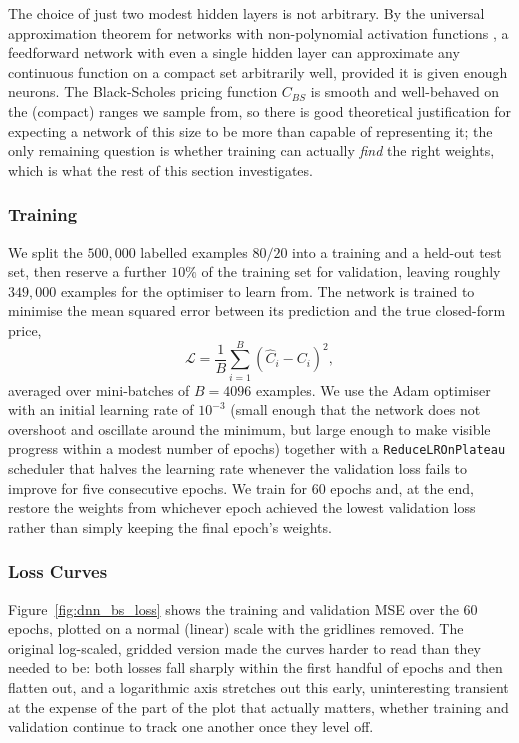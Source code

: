 \documentclass[a4paper,11pt, titlepage]{article}
\theoremstyle{definition}
\theoremstyle{plain}
\theoremstyle{remark}
\begin{document}
The choice of just two modest hidden layers is not arbitrary. By the universal approximation theorem for networks with non-polynomial activation functions \cite{leshno1993}, a feedforward network with even a single hidden layer can approximate any continuous function on a compact set arbitrarily well, provided it is given enough neurons. The Black-Scholes pricing function $C_{BS}$ is smooth and well-behaved on the (compact) ranges we sample from, so there is good theoretical justification for expecting a network of this size to be more than capable of representing it; the only remaining question is whether training can actually \emph{find} the right weights, which is what the rest of this section investigates.

\subsubsection{Training}

We split the $500{,}000$ labelled examples $80/20$ into a training and a held-out test set, then reserve a further $10\%$ of the training set for validation, leaving roughly $349{,}000$ examples for the optimiser to learn from. The network is trained to minimise the mean squared error between its prediction and the true closed-form price,
\[
\mathcal{L} = \frac{1}{B}\sum_{i=1}^{B}\left(\hat C_i - C_i\right)^2,
\]
averaged over mini-batches of $B = 4096$ examples. We use the Adam optimiser \cite{kingma2015} with an initial learning rate of $10^{-3}$ (small enough that the network does not overshoot and oscillate around the minimum, but large enough to make visible progress within a modest number of epochs) together with a \texttt{ReduceLROnPlateau} scheduler that halves the learning rate whenever the validation loss fails to improve for five consecutive epochs. We train for $60$ epochs and, at the end, restore the weights from whichever epoch achieved the lowest validation loss rather than simply keeping the final epoch's weights.

\subsubsection{Loss Curves}

Figure~\ref{fig:dnn_bs_loss} shows the training and validation MSE over the $60$ epochs, plotted on a normal (linear) scale with the gridlines removed. The original log-scaled, gridded version made the curves harder to read than they needed to be: both losses fall sharply within the first handful of epochs and then flatten out, and a logarithmic axis stretches out this early, uninteresting transient at the expense of the part of the plot that actually matters, whether training and validation continue to track one another once they level off.
\end{document}

